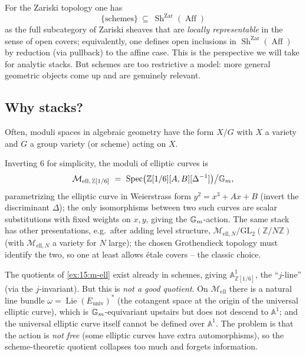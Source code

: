 \begin{example}
\label{ex:15:schemes}
For the Zariski topology one has
\begin{equation*}
\{\text{schemes}\}\ \subseteq\ \operatorname{Sh}^{\mathrm{Zar}}(\operatorname{Aff})
\end{equation*}
as the full subcategory of Zariski sheaves that are \emph{locally representable} in
the sense of open covers; equivalently, one defines open inclusions in
$\operatorname{Sh}^{\mathrm{Zar}}(\operatorname{Aff})$ by reduction (via pullback) to
the affine case. This is the perspective we will take for analytic stacks. But
schemes are too restrictive a model: more general geometric objects come up and are
genuinely relevant.
\end{example}

\subsection{Why stacks?}
\label{subsec:15:why-stacks}

Often, moduli spaces in algebraic geometry have the form $X/G$ with $X$ a variety
and $G$ a group variety (or scheme) acting on $X$.

\begin{example}
\label{ex:15:m-ell}
Inverting $6$ for simplicity, the moduli of elliptic curves is
\begin{equation*}
\mathcal{M}_{\mathrm{ell},\,\mathbb{Z}[1/6]}\ =\ \operatorname{Spec}\bigl(\mathbb{Z}[1/6][A,B][\Delta^{-1}]\bigr)\big/\Gm ,
\end{equation*}
parametrizing the elliptic curve in Weierstrass form $y^2 = x^3 + Ax + B$ (invert
the discriminant $\Delta$); the only isomorphisms between two such curves are scalar
substitutions with fixed weights on $x,y$, giving the $\mathbb{G}_{m}$-action. The same stack
has other presentations, e.g.\ after adding level structure,
$\mathcal{M}_{\mathrm{ell},N}/\mathrm{GL}_2(\mathbb{Z}/N\mathbb{Z})$ (with
$\mathcal{M}_{\mathrm{ell},N}$ a variety for $N$ large); the chosen Grothendieck
topology must identify the two, so one at least allows \'etale covers -- the classic
choice.
\end{example}

\begin{remark}
\label{rmk:15:bad-quotient}
The quotients of \cref{ex:15:m-ell} exist already in schemes, giving
$\mathbb{A}^1_{\mathbb{Z}[1/6]}$, the ``$j$-line'' (via the $j$-invariant). But this
is \emph{not a good quotient}. On $\mathcal{M}_{\mathrm{ell}}$ there is a natural
line bundle $\omega = \operatorname{Lie}(E_{\mathrm{univ}})^{*}$ (the cotangent space
at the origin of the universal elliptic curve), which is $\mathbb{G}_{m}$-equivariant upstairs
but does not descend to $\mathbb{A}^1$; and the universal elliptic curve itself
cannot be defined over $\mathbb{A}^1$. The problem is that the action is \emph{not
free} (some elliptic curves have extra automorphisms), so the scheme-theoretic
quotient collapses too much and forgets information.
\end{remark}

